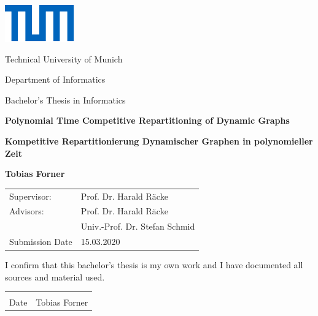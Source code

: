 	\begin{titlepage}
		\begin{center}
			\includegraphics{res/Universitaet_Logo_RGB.pdf}
			\vspace*{1cm}
			
			\large
			Technical University of Munich\\
			\vspace*{1cm}
			
			Department of Informatics\\
			\vspace*{1cm}
			
			Bachelor's Thesis in Informatics\\
			\vspace*{1cm}
			
			\Huge
			\textbf{Polynomial Time Competitive Repartitioning of Dynamic Graphs}\\
			
			\vspace{1.5cm}
			
			\textbf{Kompetitive Repartitionierung Dynamischer Graphen in polynomieller Zeit}
			
			\vspace{2cm}
			
			\Large
			\textbf{Tobias Forner}
			
			\vspace{2cm}
			
			\large
			\begin{tabular}{l l}
				Supervisor: & Prof. Dr. Harald R\"acke\\
				Advisors: & Prof. Dr. Harald R\"acke\\
				${}$ & Univ.-Prof. Dr. Stefan Schmid\\
				Submission Date & 15.03.2020
			\end{tabular}
			
			\vfill
			
		\end{center}
	\end{titlepage}
	
	
	\thispagestyle{empty}
	\noindent I confirm that this bachelor's thesis is my own work and I have documented all sources and material used.\nl\nl
	\begin{center}
		\noindent\begin{tabular}{cc}
			\makebox[2.5in]{\hrulefill} & \makebox[2.5in]{\hrulefill}\\
			Date &	Tobias Forner
			
		\end{tabular}
		
	\end{center}
	
	
	\clearpage